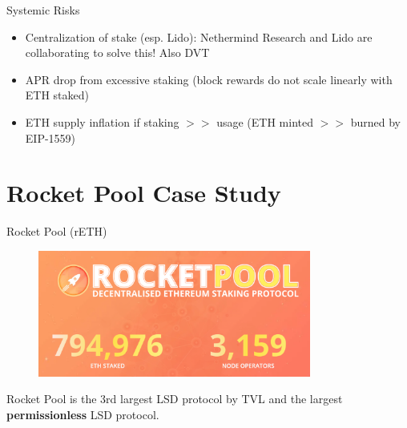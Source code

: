 \documentclass{beamer}
\begin{document}
\begin{frame}{Systemic Risks}
    \begin{itemize}
        \item Centralization of stake (esp. Lido): Nethermind Research and Lido are collaborating to solve this\footnotemark! Also DVT
        \item APR drop from excessive staking (block rewards do not scale linearly with ETH staked)
        \item ETH supply inflation if staking $>>$ usage (ETH minted $>>$ burned by EIP-1559)
    \end{itemize}

\end{frame}

\section[Rocket Pool Case Study]{Rocket Pool Case Study}

\begin{frame}{Rocket Pool (rETH)}
    \begin{figure}
        \centering
        \includegraphics[width=0.8\textwidth]{figures/rpl_logo.png}
    \end{figure}
    Rocket Pool is the 3rd largest LSD protocol by TVL and the largest \textbf{permissionless} LSD protocol.
\end{frame}
\end{document}
